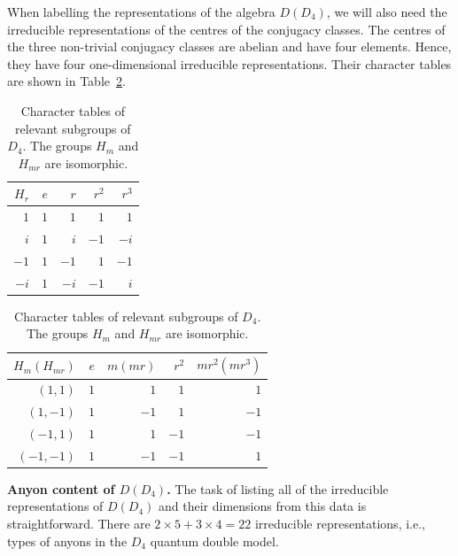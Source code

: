 \documentclass[a4paper,twocolumn,11pt, accepted=2024-06-14]{quantumarticle}
\begin{document}
When labelling the representations of the algebra $D(D_4)$, we will also need the irreducible representations of the centres of the conjugacy classes. The centres of the three non-trivial conjugacy classes are abelian and have four elements. Hence, they have four one-dimensional irreducible representations. Their character tables are shown in Table~\ref{tab:char_sub}.
\begin{table}[h]
\centering
\begin{tabular}{|r|rrrr|}\hline
  $H_r$ & $e$ & $r$ & $r^2$ & $r^3$ \\ \hline
$1$ & $1$   & $1$            & $1$             & $1$                                  \\ 
$i$ & $1$   & $i$            & $-1$             & $-i$                                  \\ 
$-1$ & $1$   & $-1$            & $1$             & $-1$                                  \\ 
$-i$ & $1$   & $-i$            & $-1$             & $i$                                  \\ \hline
\end{tabular}

\vspace{0.3cm}

\begin{tabular}{|r|rrrr|}\hline
  $H_m (H_{mr})$ & $e$ & $m(mr)$ & $r^2$ & $mr^2(mr^3)$ \\ \hline
$(1,1)$ & $1$   & $1$            & $1$             & $1$                                  \\ 
$(1,-1)$ & $1$   & $-1$            & $1$             & $-1$                                  \\ 
$(-1,1)$ & $1$   & $1$            & $-1$             & $-1$                                  \\ 
$(-1,-1)$ & $1$   & $-1$            & $-1$             & $1$                                  \\ \hline
\end{tabular}
\caption{Character tables of relevant subgroups of $D_4$. The groups $H_m$ and $H_{mr}$ are isomorphic.}
\label{tab:char_sub}
\end{table}


\textbf{Anyon content of $D(D_4)$.}
The task of listing all of the irreducible representations of $D(D_4)$ and their dimensions from this data is straightforward. There are $2 \times 5  + 3 \times 4 = 22$ irreducible representations, i.e., types of anyons in the $D_4$ quantum double model.
\end{document}
